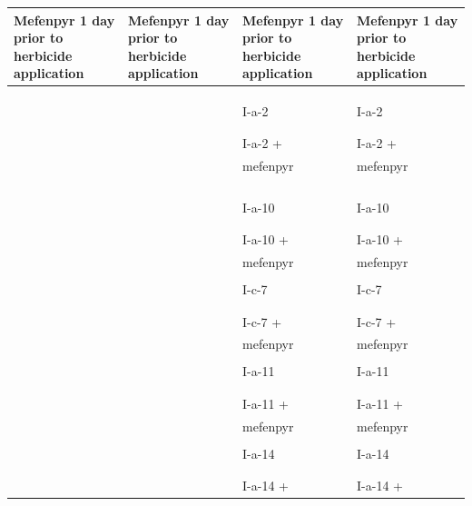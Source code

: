 \documentclass[11pt,a4paper]{article}
\begin{document}
\begin{table}[h]
\begin{tabular}{|l|l|l|l|}
\hline
Mefenpyr 1 day prior to herbicide application & Mefenpyr 1 day prior to herbicide application & Mefenpyr 1 day prior to herbicide application & Mefenpyr 1 day prior to herbicide application \\ \hline
 &  &  &  \\ \hline
 &  &  &  \\ \hline
 &  &  &  \\ \hline
 &  & I-a-2 & I-a-2 \\ \hline
 &  &  &  \\ \hline
 &  &  &  \\ \hline
 &  & I-a-2 + & I-a-2 + \\ \hline
 &  & mefenpyr & mefenpyr \\ \hline
 &  &  &  \\ \hline
 &  &  &  \\ \hline
 &  &  &  \\ \hline
 &  &  &  \\ \hline
 &  & I-a-10 & I-a-10 \\ \hline
 &  &  &  \\ \hline
 &  &  &  \\ \hline
 &  & I-a-10 + & I-a-10 + \\ \hline
 &  & mefenpyr & mefenpyr \\ \hline
 &  &  &  \\ \hline
 &  & I-c-7 & I-c-7 \\ \hline
 &  &  &  \\ \hline
 &  &  &  \\ \hline
 &  & I-c-7 + & I-c-7 + \\ \hline
 &  & mefenpyr & mefenpyr \\ \hline
 &  &  &  \\ \hline
 &  & I-a-11 & I-a-11 \\ \hline
 &  &  &  \\ \hline
 &  &  &  \\ \hline
 &  & I-a-11 + & I-a-11 + \\ \hline
 &  & mefenpyr & mefenpyr \\ \hline
 &  &  &  \\ \hline
 &  & I-a-14 & I-a-14 \\ \hline
 &  &  &  \\ \hline
 &  &  &  \\ \hline
 &  & I-a-14 + & I-a-14 + \\ \hline

\end{tabular}
\end{table}
\end{document}

